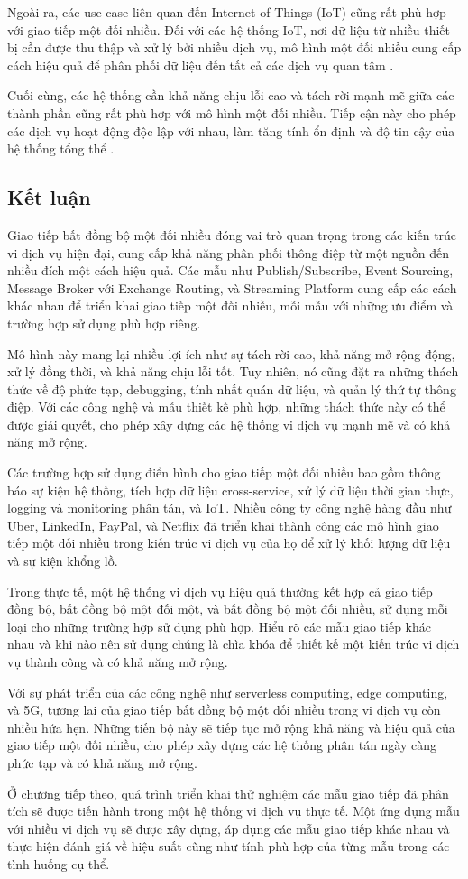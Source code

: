 Ngoài ra, các use case liên quan đến Internet of Things (IoT) cũng rất phù hợp với giao tiếp một đối nhiều. Đối với các hệ thống IoT, nơi dữ liệu từ nhiều thiết bị cần được thu thập và xử lý bởi nhiều dịch vụ, mô hình một đối nhiều cung cấp cách hiệu quả để phân phối dữ liệu đến tất cả các dịch vụ quan tâm \cite{indrasiri2020}.

Cuối cùng, các hệ thống cần khả năng chịu lỗi cao và tách rời mạnh mẽ giữa các thành phần cũng rất phù hợp với mô hình một đối nhiều. Tiếp cận này cho phép các dịch vụ hoạt động độc lập với nhau, làm tăng tính ổn định và độ tin cậy của hệ thống tổng thể \cite{fowler2002}.

\subsection{Kết luận}
Giao tiếp bất đồng bộ một đối nhiều đóng vai trò quan trọng trong các kiến trúc vi dịch vụ hiện đại, cung cấp khả năng phân phối thông điệp từ một nguồn đến nhiều đích một cách hiệu quả. Các mẫu như Publish/Subscribe, Event Sourcing, Message Broker với Exchange Routing, và Streaming Platform cung cấp các cách khác nhau để triển khai giao tiếp một đối nhiều, mỗi mẫu với những ưu điểm và trường hợp sử dụng phù hợp riêng.

Mô hình này mang lại nhiều lợi ích như sự tách rời cao, khả năng mở rộng động, xử lý đồng thời, và khả năng chịu lỗi tốt. Tuy nhiên, nó cũng đặt ra những thách thức về độ phức tạp, debugging, tính nhất quán dữ liệu, và quản lý thứ tự thông điệp. Với các công nghệ và mẫu thiết kế phù hợp, những thách thức này có thể được giải quyết, cho phép xây dựng các hệ thống vi dịch vụ mạnh mẽ và có khả năng mở rộng.

Các trường hợp sử dụng điển hình cho giao tiếp một đối nhiều bao gồm thông báo sự kiện hệ thống, tích hợp dữ liệu cross-service, xử lý dữ liệu thời gian thực, logging và monitoring phân tán, và IoT. Nhiều công ty công nghệ hàng đầu như Uber, LinkedIn, PayPal, và Netflix đã triển khai thành công các mô hình giao tiếp một đối nhiều trong kiến trúc vi dịch vụ của họ để xử lý khối lượng dữ liệu và sự kiện khổng lồ.

Trong thực tế, một hệ thống vi dịch vụ hiệu quả thường kết hợp cả giao tiếp đồng bộ, bất đồng bộ một đối một, và bất đồng bộ một đối nhiều, sử dụng mỗi loại cho những trường hợp sử dụng phù hợp. Hiểu rõ các mẫu giao tiếp khác nhau và khi nào nên sử dụng chúng là chìa khóa để thiết kế một kiến trúc vi dịch vụ thành công và có khả năng mở rộng.

Với sự phát triển của các công nghệ như serverless computing, edge computing, và 5G, tương lai của giao tiếp bất đồng bộ một đối nhiều trong vi dịch vụ còn nhiều hứa hẹn. Những tiến bộ này sẽ tiếp tục mở rộng khả năng và hiệu quả của giao tiếp một đối nhiều, cho phép xây dựng các hệ thống phân tán ngày càng phức tạp và có khả năng mở rộng.

Ở chương tiếp theo, quá trình triển khai thử nghiệm các mẫu giao tiếp đã phân tích sẽ được tiến hành trong một hệ thống vi dịch vụ thực tế. Một ứng dụng mẫu với nhiều vi dịch vụ sẽ được xây dựng, áp dụng các mẫu giao tiếp khác nhau và thực hiện đánh giá về hiệu suất cũng như tính phù hợp của từng mẫu trong các tình huống cụ thể.